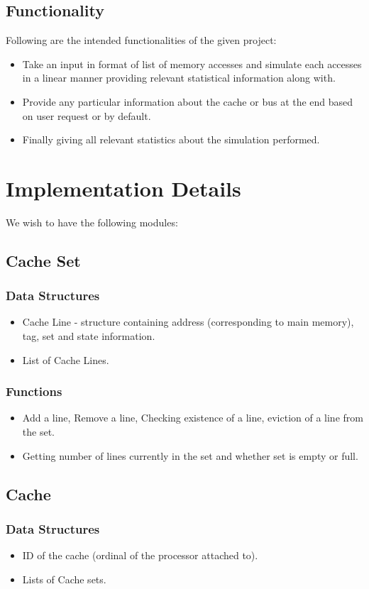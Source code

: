 \documentclass{article}
\begin{document}
\subsection{Functionality}
Following are the intended functionalities of the given project:
\begin{itemize}
\item Take an input in format of list of memory accesses and simulate each accesses in a linear manner providing relevant statistical information along with.
\item Provide any particular information about the cache or bus at the end based on user request or by default.
\item Finally giving all relevant statistics about the simulation performed.
\end{itemize}
\section{Implementation Details}
We wish to have the following modules:
\subsection{Cache Set}
\subsubsection*{Data Structures}
\begin{itemize}
\item Cache Line - structure containing address (corresponding to main memory), tag, set and state information.
\item List of Cache Lines.
\end{itemize}
\subsubsection*{Functions}
\begin{itemize}
\item Add a line, Remove a line, Checking existence of a line, eviction of a line from the set.
\item Getting number of lines currently in the set and whether set is empty or full.
\end{itemize}
\subsection{Cache}
\subsubsection*{Data Structures}
\begin{itemize}
\item ID of the cache (ordinal of the processor attached to).
\item Lists of Cache sets.
\end{itemize}
\end{document}
